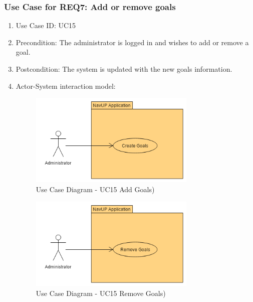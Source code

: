 \documentclass[11pt, a4paper]{article}
\begin{document}
		\subsubsection{Use Case for REQ7: Add or remove goals}
			\begin{enumerate}
			\renewcommand{\labelenumi}{{\textbf{\arabic{enumi}.}}}
			\item Use Case ID: UC15
			\item Precondition: The administrator is logged in and wishes to add or remove a goal.
			\item Postcondition: The system is updated with the new goals information.
			\item Actor-System interaction model:
				\graphicspath{ {./Images/Administrator/} }
				\begin{figure}[h]
				\caption{Use Case Diagram - UC15 Add Goals)}
				\includegraphics[width = 300px]{AddGoals.png}
				\end{figure}
		
				\graphicspath{ {./Images/Administrator/} }
				\begin{figure}[h]
				\caption{Use Case Diagram - UC15  Remove Goals)}
				\includegraphics[width = 300px]{RemoveGoals.png}
				\end{figure}
			\end{enumerate}
\end{document}
